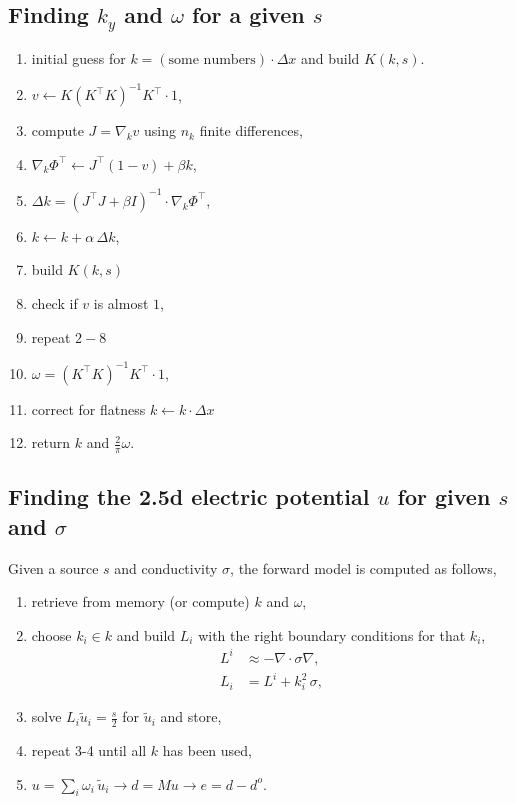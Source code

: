 \documentclass[a4paper,12pt]{article}
\begin{document}
\subsection*{Finding $k_y$ and $\omega$ for a given $s$}
\begin{enumerate}
\item initial guess for $k=(\text{some numbers})\cdot\Delta x$ and build $K(k,s)$.
\item $v\gets K(K^\top K)^{-1}K^\top \cdot 1$,
\item compute $J=\nabla_k v$ using $n_k$ finite differences,
\item $ \nabla_k \Phi^\top \gets J^\top(1-v)+\beta k$,
\item $\Delta k = (J^\top J+\beta I)^{-1}\cdot \nabla_k \Phi^\top$,
\item $k\gets k+\alpha\,\Delta k$,
\item build $K(k,s)$
\item check if $v$ is almost $1$, 
\item repeat $2-8$
\item $\omega=(K^\top K)^{-1}K^\top \cdot 1$,
\item \color{red}correct for flatness $k\gets k\cdot\Delta x$ \color{black}
\item return $k$ and $\frac{2}{\pi}\omega$.
\end{enumerate}
%
\subsection*{Finding the 2.5d electric potential $u$ for given $s$ and $\sigma$}
Given a source $s$ and conductivity $\sigma$, the forward model is computed as follows,
\begin{enumerate}
\item retrieve from memory (or compute) $k$ and $\omega$,
\item choose $k_i\in k$ and build $L_i$ with the right boundary conditions for that $k_i$,
\begin{align*}
L^{i} &\approx -\nabla\cdot\sigma\nabla,\\
L_{i} &= L^{i} + k_i^2\,\sigma,
\end{align*}
\item solve $L_{i}\tilde{u}_{i}=\frac{s}{2}$ for $\tilde{u}_{i}$ and store,
\item repeat 3-4 until all $k$ has been used,
\item $u=\sum_i \omega_i \,\tilde{u}_{i} \to d=Mu \to e=d-d^o$.
\end{enumerate}
\end{document}
